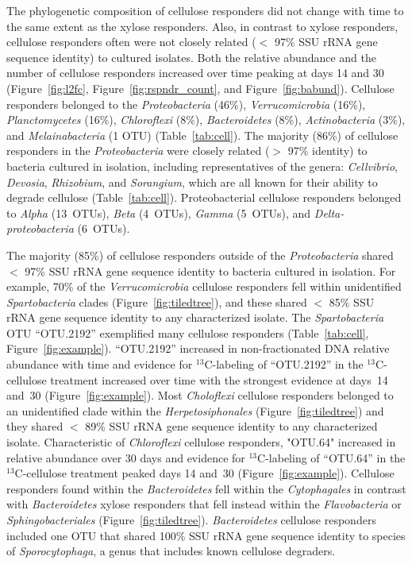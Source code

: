 The phylogenetic composition of cellulose responders did not change with time
to the same extent as the xylose responders. Also, in contrast to xylose
responders, cellulose responders often were not closely related ($<$ 97\% SSU
rRNA gene sequence identity) to cultured isolates. Both the relative abundance
and the number of cellulose responders increased over time peaking at days 14
and 30 (Figure~\ref{fig:l2fc}, Figure~\ref{fig:rspndr_count}, and Figure~\ref{fig:babund}).
Cellulose responders belonged to the \textit{Proteobacteria} (46\%),
\textit{Verrucomicrobia} (16\%), \textit{Planctomycetes} (16\%),
\textit{Chloroflexi} (8\%), \textit{Bacteroidetes} (8\%),
\textit{Actinobacteria} (3\%), and \textit{Melainabacteria} (1 OTU)
(Table~\ref{tab:cell}). The majority (86\%) of cellulose responders in the
\textit{Proteobacteria} were closely related ($>$ 97\% identity) to bacteria
cultured in isolation, including representatives of the genera:
\textit{Cellvibrio}, \textit{Devosia}, \textit{Rhizobium}, and
\textit{Sorangium}, which are all known for their ability to degrade cellulose
(Table~\ref{tab:cell}). Proteobacterial cellulose responders belonged to
\textit{Alpha} (13~OTUs), \textit{Beta} (4~OTUs), \textit{Gamma} (5~OTUs), and
\textit{Delta-proteobacteria} (6~OTUs). 

The majority (85\%) of cellulose responders outside of the
\textit{Proteobacteria} shared  $<$ 97\% SSU rRNA gene sequence identity to
bacteria cultured in isolation. For example, 70\% of the
\textit{Verrucomicrobia} cellulose responders fell within unidentified
\textit{Spartobacteria} clades (Figure~\ref{fig:tiledtree}), and these shared $<$
85\% SSU rRNA gene sequence identity to any characterized isolate. The
\textit{Spartobacteria} OTU ``OTU.2192'' exemplified many cellulose responders
(Table~\ref{tab:cell}, Figure~\ref{fig:example}).
``OTU.2192'' increased in non-fractionated DNA relative abundance with time and
evidence for $^{13}$C-labeling of ``OTU.2192'' in the $^{13}$C-cellulose
treatment increased over time with the strongest evidence at days~14 and~30
(Figure~\ref{fig:example}). Most \textit{Choloflexi} cellulose responders
belonged to an unidentified clade within the \textit{Herpetosiphonales}
(Figure~\ref{fig:tiledtree}) and they shared $<$ 89\% SSU rRNA gene sequence
identity to any characterized isolate. Characteristic of \textit{Chloroflexi}
cellulose responders, "OTU.64" increased in relative abundance over 30 days and
evidence for $^{13}$C-labeling of ``OTU.64'' in the $^{13}$C-cellulose
treatment peaked days 14 and~30 (Figure~\ref{fig:example}). Cellulose
responders found within the \textit{Bacteroidetes} fell within the
\textit{Cytophagales} in contrast with \textit{Bacteroidetes} xylose responders
that fell instead within the \textit{Flavobacteria} or
\textit{Sphingobacteriales} (Figure~\ref{fig:tiledtree}).
\textit{Bacteroidetes} cellulose responders included one OTU that shared 100\%
SSU rRNA gene sequence identity to species of \textit{Sporocytophaga}, a genus
that includes known cellulose degraders.

